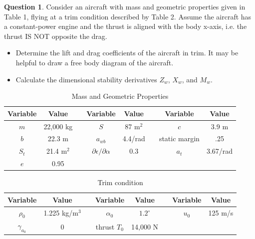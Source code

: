 \documentclass{article}
\theoremstyle{definition}
\newtheorem{question}{Question}
\begin{document}
\begin{question}
Consider an aircraft with mass and geometric properties given in Table 1, flying at a trim condition described by Table 2. Assume the aircraft has a constant-power engine and the thrust is aligned with the body x-axis, i.e. the thrust IS NOT opposite the drag.

\begin{itemize}
\item Determine the lift and drag coefficients of the aircraft in trim. It may be helpful to draw a free body diagram of the aircraft.
\item Calculate the dimensional stability derivatives $Z_w$, $X_w$, and $M_w$.
\end{itemize}

\begin{table}[ht] 
\caption{Mass and Geometric Properties} %
\centering %
\begin{tabular}{| c | c | c | c | c | c | c | c |} %
\hline %
Variable & Value & & Variable & Value & & Variable & Value\\ [0.5ex] %
\hline %
$m$ & 22,000 kg & & $S$ & 87 m$^2$ & & $c$ & 3.9 m \\
$b$ & 22.3 m & & $a_{wb}$ & 4.4/rad & & static margin & .25 \\
$S_t$ & 21.4 m$^2$ & & $\partial \epsilon / \partial \alpha$ & 0.3 & & $a_{t}$ & 3.67/rad \\
$e$ & 0.95 & & & & & &\\

\hline %
\end{tabular} 
\label{table:nonlin} %
\end{table}

\begin{table}[ht] 
\caption{Trim condition} %
\centering %
\begin{tabular}{| c | c | c | c | c | c | c | c |} %
\hline %
Variable & Value & & Variable & Value & & Variable & Value \\ [0.5ex] %
\hline %
$\rho_0$ & 1.225 kg/m$^3$ & & $\alpha_0$ & $1.2^{\circ}$ & & $u_0$ & 125 m/s \\
$\gamma_{a_0}$ & 0 & & thrust $T_0$ & 14,000 N & &  & \\
\hline %
\end{tabular} 
\label{table:nonlin} %
\end{table}
\end{question}
\end{document}
